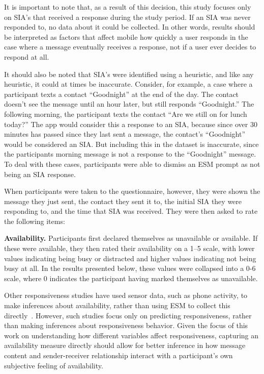 \documentclass[12pt]{nuthesis}	%
\begin{document}
It is important to note that, as a result of this decision, this study focuses only on SIA's that received a response during the study period. If an SIA was never responded to, no data about it could be collected. In other words, results should be interpreted as factors that affect mobile how quickly a user responds in the case where a message eventually receives a response, not if a user ever decides to respond at all.

It should also be noted that SIA's were identified using a heuristic, and like any heuristic, it could at times be inaccurate. Consider, for example, a case where a participant texts a contact ``Goodnight'' at the end of the day. The contact doesn't see the message until an hour later, but still responds ``Goodnight.'' The following morning, the participant texts the contact ``Are we still on for lunch today?'' The app would consider this a response to an SIA, because since over 30 minutes has passed since they last sent a message, the contact's ``Goodnight'' would be considered an SIA. But including this in the dataset is inaccurate, since the participants morning message is not a response to the ``Goodnight'' message. To deal with these cases, participants were able to dismiss an ESM prompt as not being an SIA response.

When participants were taken to the questionnaire, however, they were shown the message they just sent, the contact they sent it to, the initial SIA they were responding to, and the time that SIA was received. They were then asked to rate the following items:

\textbf{Availability.} Participants first declared themselves as unavailable or available. If these were available, they then rated their availability on a 1--5 scale, with lower values indicating being busy or distracted and higher values indicating not being busy at all. In the results presented below, these values were collapsed into a 0-6 scale, where 0 indicates the participant having marked themselves as unavailable.

Other responsiveness studies have used sensor data, such as phone activity, to make inferences about availability, rather than using ESM to collect this directly~\citep[e.g.,][]{pielot2014didn}. However, such studies focus only on predicting responsiveness, rather than making inferences about responsiveness behavior. Given the focus of this work on understanding how different variables affect responsiveness, capturing an availability measure directly should allow for better inference in how message content and sender-receiver relationship interact with a participant's own subjective feeling of availability.
\end{document}

